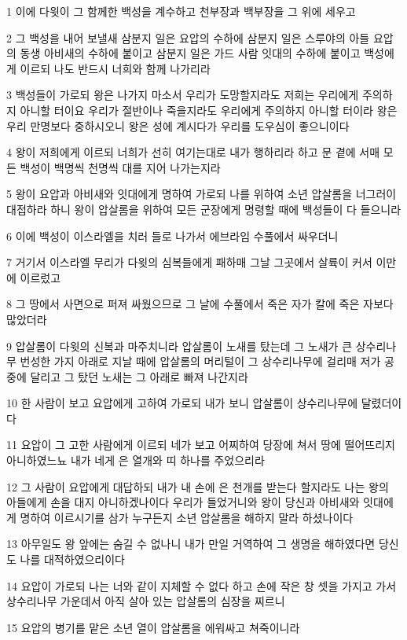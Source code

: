 \par 1 이에 다윗이 그 함께한 백성을 계수하고 천부장과 백부장을 그 위에 세우고
\par 2 그 백성을 내어 보낼새 삼분지 일은 요압의 수하에 삼분지 일은 스루야의 아들 요압의 동생 아비새의 수하에 붙이고 삼분지 일은 가드 사람 잇대의 수하에 붙이고 백성에게 이르되 나도 반드시 너희와 함께 나가리라
\par 3 백성들이 가로되 왕은 나가지 마소서 우리가 도망할지라도 저희는 우리에게 주의하지 아니할 터이요 우리가 절반이나 죽을지라도 우리에게 주의하지 아니할 터이라 왕은 우리 만명보다 중하시오니 왕은 성에 계시다가 우리를 도우심이 좋으니이다
\par 4 왕이 저희에게 이르되 너희가 선히 여기는대로 내가 행하리라 하고 문 곁에 서매 모든 백성이 백명씩 천명씩 대를 지어 나가는지라
\par 5 왕이 요압과 아비새와 잇대에게 명하여 가로되 나를 위하여 소년 압살롬을 너그러이 대접하라 하니 왕이 압살롬을 위하여 모든 군장에게 명령할 때에 백성들이 다 들으니라
\par 6 이에 백성이 이스라엘을 치러 들로 나가서 에브라임 수풀에서 싸우더니
\par 7 거기서 이스라엘 무리가 다윗의 심복들에게 패하매 그날 그곳에서 살륙이 커서 이만에 이르렀고
\par 8 그 땅에서 사면으로 퍼져 싸웠으므로 그 날에 수풀에서 죽은 자가 칼에 죽은 자보다 많았더라
\par 9 압살롬이 다윗의 신복과 마주치니라 압살롬이 노새를 탔는데 그 노새가 큰 상수리나무 번성한 가지 아래로 지날 때에 압살롬의 머리털이 그 상수리나무에 걸리매 저가 공중에 달리고 그 탔던 노새는 그 아래로 빠져 나간지라
\par 10 한 사람이 보고 요압에게 고하여 가로되 내가 보니 압살롬이 상수리나무에 달렸더이다
\par 11 요압이 그 고한 사람에게 이르되 네가 보고 어찌하여 당장에 쳐서 땅에 떨어뜨리지 아니하였느뇨 내가 네게 은 열개와 띠 하나를 주었으리라
\par 12 그 사람이 요압에게 대답하되 내가 내 손에 은 천개를 받는다 할지라도 나는 왕의 아들에게 손을 대지 아니하겠나이다 우리가 들었거니와 왕이 당신과 아비새와 잇대에게 명하여 이르시기를 삼가 누구든지 소년 압살롬을 해하지 말라 하셨나이다
\par 13 아무일도 왕 앞에는 숨길 수 없나니 내가 만일 거역하여 그 생명을 해하였다면 당신도 나를 대적하였으리이다
\par 14 요압이 가로되 나는 너와 같이 지체할 수 없다 하고 손에 작은 창 셋을 가지고 가서 상수리나무 가운데서 아직 살아 있는 압살롬의 심장을 찌르니
\par 15 요압의 병기를 맡은 소년 열이 압살롬을 에워싸고 쳐죽이니라
